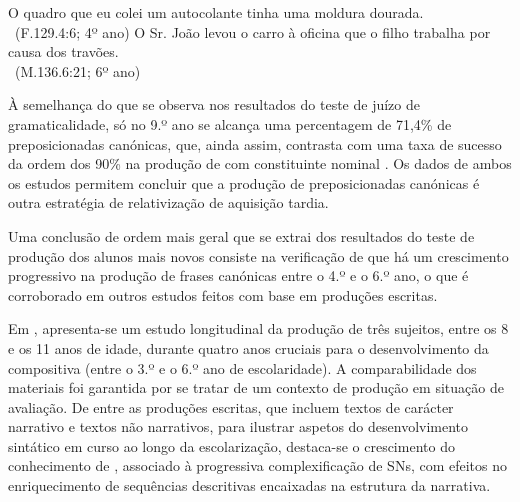 \documentclass[output=paper]{LSP/langsci}
\begin{document}
\ea\label{ex:costacostagoncalves_21} O quadro que eu colei um autocolante tinha uma moldura dourada.\\~\hfill(F.129.4:6; 4º ano)\z
\ea\label{ex:costacostagoncalves_22} O Sr. João levou o carro à oficina que o filho trabalha por causa dos travões.\\~\hfill(M.136.6:21; 6º ano)\z

À semelhança do que se observa nos resultados do teste de juízo de gramaticalidade, só no 9.º ano se alcança uma percentagem de 71,4\% de  preposicionadas canónicas, que, ainda assim, contrasta com uma taxa de sucesso da ordem dos 90\% na produção de  com constituinte nominal \citep[103]{valente2008}. Os dados de ambos os estudos permitem concluir que a produção de  preposicionadas canónicas é outra estratégia de relativização de aquisição tardia.

Uma conclusão de ordem mais geral que se extrai dos resultados do teste de produção dos alunos mais novos consiste na verificação de que há um crescimento progressivo na produção de frases  canónicas entre o 4.º e o 6.º ano, o que é corroborado em outros estudos feitos com base em produções escritas. 

Em \citet{costagoncalves2010}, apresenta-se um estudo longitudinal da produção  de três sujeitos, entre os 8 e os 11 anos de idade, durante quatro anos cruciais para o desenvolvimento da  compositiva (entre o 3.º e o 6.º ano de escolaridade). A comparabilidade dos materiais foi garantida por se tratar de um contexto de produção  em situação de avaliação. De entre as produções escritas, que incluem textos de carácter narrativo e textos não narrativos, para ilustrar aspetos do desenvolvimento sintático em curso ao longo da escolarização, destaca-se o crescimento do conhecimento de , associado à progressiva complexificação de SNs, com efeitos no enriquecimento de sequências descritivas encaixadas na estrutura da narrativa.
\end{document}
